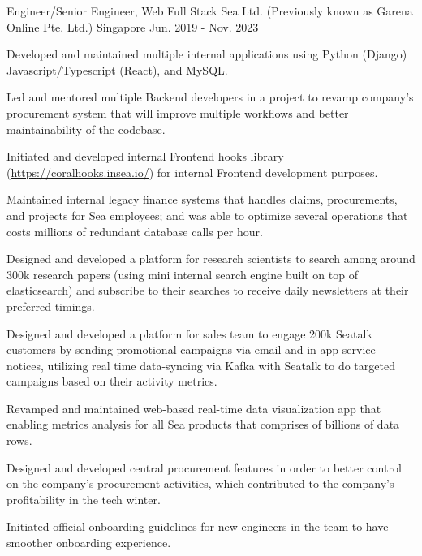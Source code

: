 \begin{cventries}
  \cventry
  {Engineer/Senior Engineer, Web Full Stack} %
  {Sea Ltd. (Previously known as Garena Online Pte. Ltd.)} %
  {Singapore} %
  {Jun. 2019 - Nov. 2023} %
  {
    \begin{cvitems} %
      \item {Developed and maintained multiple internal applications using Python (Django) Javascript/Typescript (React), and MySQL.}
      \item {Led and mentored multiple Backend developers in a project to revamp company's procurement system that will improve multiple workflows and better maintainability of the codebase.}
      \item {Initiated and developed internal Frontend hooks library (\url{https://coralhooks.insea.io/}) for internal Frontend development purposes.}
      \item {Maintained internal legacy finance systems that handles claims, procurements, and projects for Sea employees; and was able to optimize several operations that costs millions of redundant database calls per hour.}
      \item {Designed and developed a platform for research scientists to search among around 300k research papers (using mini internal search engine built on top of elasticsearch) and subscribe to their searches to receive daily newsletters at their preferred timings.}
      \item {Designed and developed a platform for sales team to engage 200k Seatalk customers by sending promotional campaigns via email and in-app service notices, utilizing real time data-syncing via Kafka with Seatalk to do targeted campaigns based on their activity metrics.}
      \item {Revamped and maintained web-based real-time data visualization app that enabling metrics analysis for all Sea products that comprises of billions of data rows.}
      \item {Designed and developed central procurement features in order to better control on the company's procurement activities, which contributed to the company's profitability in the tech winter.}
      \item {Initiated official onboarding guidelines for new engineers in the team to have smoother onboarding experience.}
    \end{cvitems}
}


\end{cventries}
